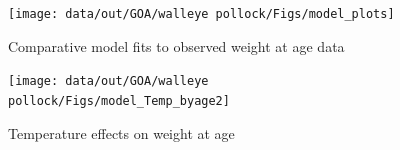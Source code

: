 \documentclass[
]{article}
\begin{document}
\begin{figure}

{\centering \texttt{[image: data/out/GOA/walleye pollock/Figs/model\_plots]} 

}

\caption{Comparative model fits to observed weight at age data}\label{fig:unnamed-chunk-18}
\end{figure}

\begin{figure}

{\centering \texttt{[image: data/out/GOA/walleye pollock/Figs/model\_Temp\_byage2]} 

}

\caption{Temperature effects on weight at age}\label{fig:unnamed-chunk-19}
\end{figure}
\end{document}
